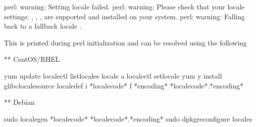 \documentclass[letterpaper,10pt,english]{sphinxmanual}
\begin{document}
\begin{sphinxVerbatim}[commandchars=\\\{\}]
perl: warning: Setting locale failed.
perl: warning: Please check that your locale settings:
      ,
      ,
      ,
      
are supported and installed on your system.
perl: warning: Falling back to a fallback locale .
\end{sphinxVerbatim}

This is printed during perl initialization and can be resolved using the following

** CentOS/RHEL

\begin{sphinxVerbatim}[commandchars=\\\{\}]
yum update
localectl list\PYGZhy{}locales
locale \PYGZhy{}a
localectl set\PYGZhy{}locale 
yum \PYGZhy{}y install glibc\PYGZhy{}locale\PYGZhy{}source 
localedef \PYGZhy{}i *locale\PYGZhy{}code* \PYGZhy{}f *encoding* *locale\PYGZhy{}code*.*encoding*
\end{sphinxVerbatim}

** Debian

\begin{sphinxVerbatim}[commandchars=\\\{\}]
sudo locale\PYGZhy{}gen *locale\PYGZhy{}code* *locale\PYGZhy{}code*.*encoding*
sudo dpkg\PYGZhy{}reconfigure locales
\end{sphinxVerbatim}
\end{document}
